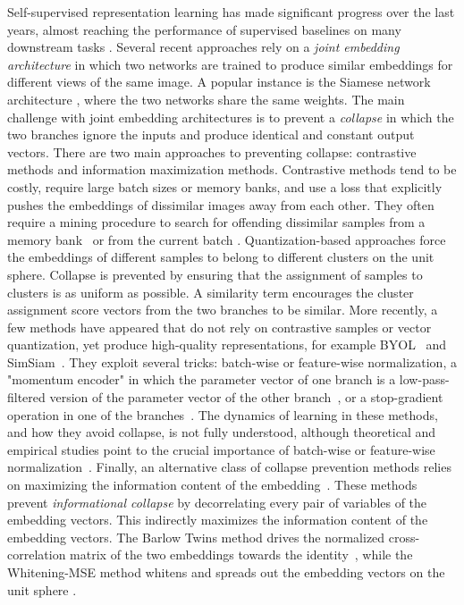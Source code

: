 \documentclass{article}
\begin{document}
Self-supervised representation learning has made significant progress over the last years, almost reaching the performance of supervised baselines on many downstream tasks \cite{bachman2019mutual, misra2020pirl, he2020moco, tian2020makes, caron2020swav, grill2020byol, chen2020simsiam, gidaris2021obow, zbontar2021barlow}. Several recent approaches rely on a {\em joint embedding architecture} in which two networks are trained to produce similar embeddings for different views of the same image. A popular instance is the Siamese network architecture \cite{bromley1994siamese}, where the two networks share the same weights. The main challenge with joint embedding architectures is to prevent a {\em collapse} in which the two branches ignore the inputs and produce identical and constant output vectors. There are two main approaches to preventing collapse: contrastive methods and information maximization methods. Contrastive \cite{bromley1994siamese, chopra2005,he2020moco, hjelm2019mutual, chen2020simclr} methods tend to be costly, require large batch sizes or memory banks, and use a loss that explicitly pushes the embeddings of dissimilar images away from each other. They often require a mining procedure to search for offending dissimilar samples from a memory bank~\cite{he2020moco} or from the current batch \cite{chen2020simclr}. Quantization-based approaches \cite{caron2020swav, caron2018clustering} force the embeddings of different samples to belong to different clusters on the unit sphere. Collapse is prevented by ensuring that the assignment of samples to clusters is as uniform as possible. A similarity term encourages the cluster assignment score vectors from the two branches to be similar. More recently, a few methods have appeared that do not rely on contrastive samples or vector quantization, yet produce high-quality representations, for example BYOL~\cite{grill2020byol} and SimSiam~\cite{chen2020simsiam}. They exploit several tricks: batch-wise or feature-wise normalization, a "momentum encoder" in which the parameter vector of one branch is a low-pass-filtered version of the parameter vector of the other branch~\cite{grill2020byol, richemond2020byolworks}, or a stop-gradient operation in one of the branches~\cite{chen2020simsiam}. The dynamics of learning in these methods, and how they avoid collapse, is not fully understood, although theoretical and empirical studies point to the crucial importance of batch-wise or feature-wise normalization~\cite{richemond2020byolworks,tian2021understanding}. Finally, an alternative class of collapse prevention methods relies on maximizing the information content of the embedding~\cite{zbontar2021barlow, ermolov2021whitening}. These methods prevent {\em informational collapse} by decorrelating every pair of variables of the embedding vectors. This indirectly maximizes the information content of the embedding vectors. The Barlow Twins method drives the normalized cross-correlation matrix of the two embeddings towards the identity~\cite{zbontar2021barlow}, while the Whitening-MSE method whitens and spreads out the embedding vectors on the unit sphere \cite{ermolov2021whitening}.
\end{document}
